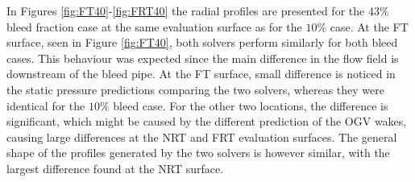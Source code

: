 In Figures \ref{fig:FT40}-\ref{fig:FRT40} the radial profiles are presented for the $43\%$ bleed fraction case at the same evaluation surface as for the $10\%$ case. At the FT surface, seen in Figure \ref{fig:FT40}, both solvers perform similarly for both bleed cases. This behaviour was expected since the main difference in the flow field is downstream of the bleed pipe. At the FT surface, small difference is noticed in the static pressure predictions comparing the two solvers, whereas they were identical for the $10\%$ bleed case. For the other two locations, the difference is significant, which might be caused by the different prediction of the OGV wakes, causing large differences at the NRT and FRT evaluation surfaces. The general shape of the profiles generated by the two solvers is however similar, with the largest difference found at the NRT surface.
